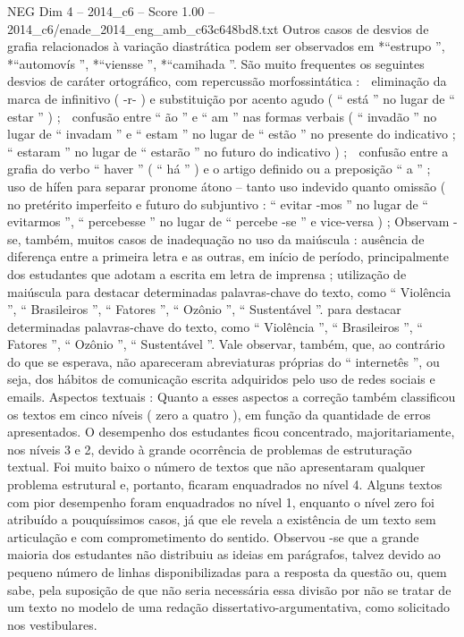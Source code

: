 \begin{textsample}{NEG Dim 4 – 2014\_c6 – Score 1.00 – 2014\_c6/enade\_2014\_eng\_amb\_c63c648bd8.txt}
Outros casos de desvios de grafia relacionados à variação diastrática podem ser observados em *“estrupo ”, *“automovís ”, *“viensse ”, *“camihada ”.
São muito frequentes os seguintes desvios de caráter ortográfico, com repercussão morfossintática :  eliminação da marca de infinitivo ( -r- ) e substituição por acento agudo ( “ está ” no lugar de “ estar ” ) ;  confusão entre “ ão ” e “ am ” nas formas verbais ( “ invadão ” no lugar de “ invadam ” e “ estam ” no lugar de “ estão ” no presente do indicativo ; “ estaram ” no lugar de “ estarão ” no futuro do indicativo ) ;  confusão entre a grafia do verbo “ haver ” ( “ há ” ) e o artigo definido ou a preposição “ a ” ;  uso de hífen para separar pronome átono – tanto uso indevido quanto omissão ( no pretérito imperfeito e futuro do subjuntivo : “ evitar -mos ” no lugar de “ evitarmos ”, “ percebesse ” no lugar de “ percebe -se ” e vice-versa ) ; Observam -se, também, muitos casos de inadequação no uso da maiúscula : ausência de diferença entre a primeira letra e as outras, em início de período, principalmente dos estudantes que adotam a escrita em letra de imprensa ; utilização de maiúscula para destacar determinadas palavras-chave do texto, como “ Violência ”, “ Brasileiros ”, “ Fatores ”, “ Ozônio ”, “ Sustentável ”. para destacar determinadas palavras-chave do texto, como “ Violência ”, “ Brasileiros ”, “ Fatores ”, “ Ozônio ”, “ Sustentável ”.
Vale observar, também, que, ao contrário do que se esperava, não apareceram abreviaturas próprias do “ internetês ”, ou seja, dos hábitos de comunicação escrita adquiridos pelo uso de redes sociais e emails.
Aspectos textuais : Quanto a esses aspectos a correção também classificou os textos em cinco níveis ( zero a quatro ), em função da quantidade de erros apresentados.
O desempenho dos estudantes ficou concentrado, majoritariamente, nos níveis 3 e 2, devido à grande ocorrência de problemas de estruturação textual.
Foi muito baixo o número de textos que não apresentaram qualquer problema estrutural e, portanto, ficaram enquadrados no nível 4.
Alguns textos com pior desempenho foram enquadrados no nível 1, enquanto o nível zero foi atribuído a pouquíssimos casos, já que ele revela a existência de um texto sem articulação e com comprometimento do sentido.
Observou -se que a grande maioria dos estudantes não distribuiu as ideias em parágrafos, talvez devido ao pequeno número de linhas disponibilizadas para a resposta da questão ou, quem sabe, pela suposição de que não seria necessária essa divisão por não se tratar de um texto no modelo de uma redação dissertativo-argumentativa, como solicitado nos vestibulares.

\end{textsample}
